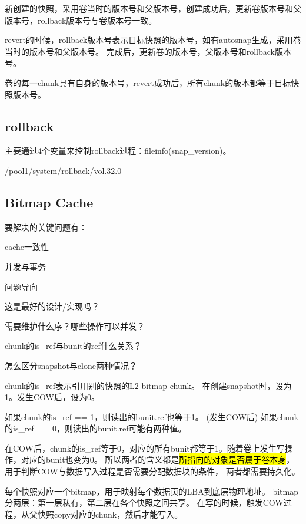 新创建的快照，采用卷当时的版本号和父版本号，创建成功后，更新卷版本号和父版本号，rollback版本号与卷版本号一致。

revert的时候，rollback版本号表示目标快照的版本号，如有autosnap生成，采用卷当时的版本号和父版本号。
完成后，更新卷的版本号，父版本号和rollback版本号。

卷的每一chunk具有自身的版本号，revert成功后，所有chunk的版本都等于目标快照版本号。

\subsection{rollback}

主要通过4个变量来控制rollback过程：fileinfo(snap\_version)。

/pool1/system/rollback/vol.32.0

\subsection{Bitmap Cache}

要解决的关键问题有：
\begin{enumbox}
\item cache一致性
\item 并发与事务
\end{enumbox}

问题导向
\begin{enumbox}
\item 这是最好的设计/实现吗？
\item 需要维护什么序？哪些操作可以并发？
\item chunk的is\_ref与bunit的ref什么关系？
\item 怎么区分snapshot与clone两种情况？
\end{enumbox}

chunk的is\_ref表示引用别的快照的L2 bitmap chunk。
在创建snapshot时，设为1。发生COW后，设为0。

如果chunk的is\_ref == 1，则读出的bunit.ref也等于1。
(发生COW后)
如果chunk的is\_ref == 0，则读出的bunit.ref可能有两种值。

在COW后，chunk的is\_ref等于0，对应的所有bunit都等于1。随着卷上发生写操作，对应的bunit也变为0。
所以两者的含义都是\hl{所指向的对象是否属于卷本身}，用于判断COW与数据写入过程是否需要分配数据块的条件，
两者都需要持久化。

每个快照对应一个bitmap，用于映射每个数据页的LBA到底层物理地址。
bitmap分两层：第一层私有，第二层在各个快照之间共享。
在写的时候，触发COW过程，从父快照copy对应的chunk，然后才能写入。

